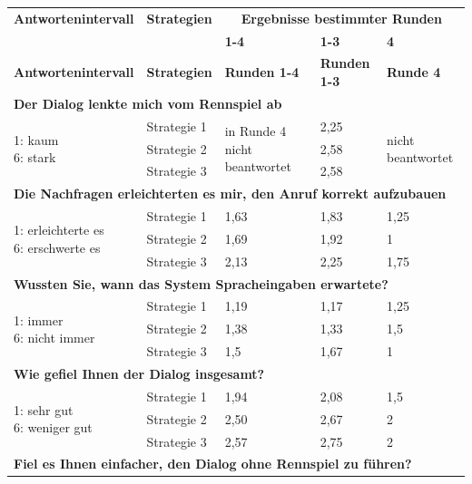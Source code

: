 \documentclass[12pt,a4paper]{scrartcl}
\begin{document}
\begin{longtable}{|p{4cm}|p{2cm}|p{2cm}|p{2cm}|p{2cm}|}
	\hline
		\textbf{Antwortenintervall}&\textbf{Strategien}&\multicolumn{3}{c|}{\textbf{Ergebnisse bestimmter Runden}}\\
	&&\textbf{1-4}&\textbf{1-3} &\textbf{4}\\
	\hline
	\endfirsthead
	\hline
	\textbf{Antwortenintervall}&\textbf{Strategien}&\textbf{Runden 1-4}&\textbf{Runden 1-3} &\textbf{Runde 4}\\
	\hline
	\endhead
		\multicolumn{5}{l}{\textbf{Der Dialog lenkte mich vom Rennspiel ab}}\\
		\hline
\multirow{3}{4cm}{1: kaum \newline 6: stark} & Strategie 1 & \multirow{3}{2,5cm}{in Runde 4 nicht beantwortet} & 2,25  & \multirow{3}{2,5cm}{nicht beantwortet} \\
 & Strategie 2 & & 2,58 & \\
 & Strategie 3 & & 2,58 & \\
\hline
		\multicolumn{5}{l}{\textbf{Die Nachfragen erleichterten es mir, den Anruf korrekt aufzubauen}}\\
		\hline
\multirow{3}{4cm}{1: erleichterte es\newline  6: erschwerte es} & Strategie 1 & 1,63 & 1,83 & 1,25 \\
 & Strategie 2 & 1,69 & 1,92 & 1 \\
 & Strategie 3 & 2,13 & 2,25 & 1,75 \\
\hline
		\multicolumn{5}{l}{\textbf{Wussten Sie, wann das System Spracheingaben erwartete?}}\\
		\hline
\multirow{3}{4cm}{1: immer \newline  6: nicht immer} & Strategie 1 & 1,19 & 1,17 & 1,25 \\
 & Strategie 2 & 1,38 & 1,33 & 1,5 \\
 & Strategie 3 & 1,5 & 1,67 & 1 \\
\hline
		\multicolumn{5}{l}{\textbf{Wie gefiel Ihnen der Dialog insgesamt?}}\\
		\hline
\multirow{3}{4cm}{1: sehr gut \newline  6: weniger gut} & Strategie 1 & 1,94 & 2,08 & 1,5 \\
 & Strategie 2 & 2,50 & 2,67 & 2 \\
 & Strategie 3 & 2,57 & 2,75 & 2 \\
\hline
		\multicolumn{5}{l}{\textbf{Fiel es Ihnen einfacher, den Dialog ohne Rennspiel zu führen?}}\\
		\hline

\end{longtable}
\end{document}
